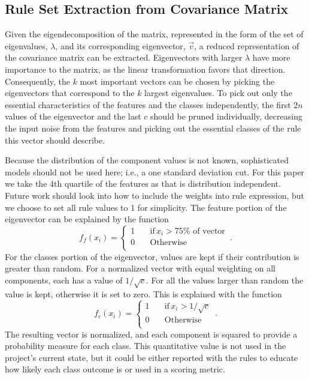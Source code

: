 \documentclass[11pt]{article}
\begin{document}
\subsection{Rule Set Extraction from Covariance Matrix}
Given the eigendecomposition of the matrix, represented in the form of the set of eigenvalues, $\lambda$, and its corresponding eigenvector, $\vec{v}$, a reduced representation of the covariance matrix can be extracted. Eigenvectors with larger $\lambda$ have more importance to the matrix, as the linear transformation favors that direction. Consequently, the $k$ most important vectors can be chosen by picking the eigenvectors that correspond to the $k$ largest eigenvalues. To pick out only the essential characteristics of the features and the classes independently, the first $2n$ values of the eigenvector and the last $c$ should be pruned individually, decreasing the input noise from the features and picking out the essential classes of the rule this vector should describe. 

Because the distribution of the component values is not known, sophisticated models should not be used here; i.e., a one standard deviation cut. For this paper we take the 4th quartile of the features as that is distribution independent. Future work should look into how to include the weights into rule expression, but we choose to set all rule values to 1 for simplicity. The feature portion of the eigenvector can be explained by the function
\begin{equation}
f_f(x_i)=\begin{cases}
          1 \quad &\text{if} \, x_i > 75\% \text{ of vector} \\
          0 \quad &\text{Otherwise} \\
     \end{cases} \, .
\end{equation}
For the classes portion of the eigenvector, values are kept if their contribution is greater than random. For a normalized vector with equal weighting on all components, each has a value of $1/\sqrt{c}$. For all the values larger than random the value is kept, otherwise it is set to zero. This is explained with the function
\begin{equation}
f_c(x_i)=\begin{cases}
          1 \quad &\text{if} \, x_i > 1/\sqrt{c} \\
          0 \quad &\text{Otherwise} \\
     \end{cases} \, .
\end{equation}
The resulting vector is normalized, and each component is squared to provide a probability measure for each class. This quantitative value is not used in the project's current state, but it could be either reported with the rules to educate how likely each class outcome is or used in a scoring metric.
\end{document}
